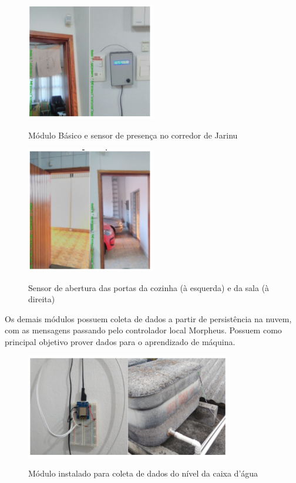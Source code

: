 \begin{figure}[H]
	\centering
	\caption{Módulo Básico e sensor de presença no corredor de Jarinu}
	\includegraphics[width=0.5\textwidth]{BasicSensorPresJarinu}
	\label{fig:BasicSensorPresJarinu}
\end{figure}

\begin{figure}[H]
	\centering
	\caption{Sensor de abertura das portas da cozinha (à esquerda) e da sala (à direita)}
	\includegraphics[width=0.5\textwidth]{SensorPortasJarinu}
	\label{fig:SensorPortasJarinu}
\end{figure}

Os demais módulos possuem coleta de dados a partir de persistência na nuvem, com as mensagens passando pelo controlador local Morpheus. Possuem como principal objetivo prover dados para o aprendizado de máquina.

\begin{figure}[H]
	\centering
	\caption{Módulo instalado para coleta de dados do nível da caixa d’água}
	\includegraphics[width=0.8\textwidth]{ModuloCxAgua}
	\label{fig:ModuloCxAgua}
\end{figure}

